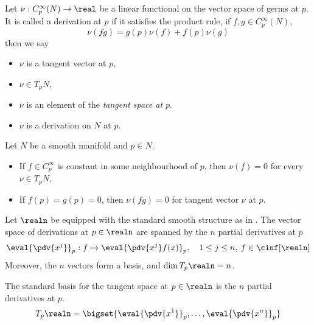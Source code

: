 \documentclass[../main-v2-manifolds.tex]{subfiles}
\begin{document}
\begin{definition}\label{lee-chp3:vector-space-of-derivations-at-p}
    Let $\nu: C_p^\infty(N)\to\real$ be a linear functional on the vector space of germs at $p$. It is called a derivation at $p$ if it satisfies the product rule, if $f,g\in C_p^\infty(N)$, 
    \[
        \nu(fg)=g(p)\nu(f)+f(p)\nu(g)
    \]
    then we say 
    \begin{itemize}
        \item $\nu$ is a tangent vector at $p$, 
        \item $\nu\in T_p N$,
        \item $\nu$ is an element of the \emph{tangent space at $p$}.
        \item $\nu$ is a derivation on $N$ at $p$.
    \end{itemize}
\end{definition}
\begin{wts}
    Let $N$ be a smooth manifold and $p\in N$.
    \begin{itemize}
        \item If $f\in C^\infty_p$ is constant in some neighbourhood of $p$, then $\nu(f)=0$ for every $\nu\in T_pN$,
        \item If $f(p)=g(p)=0$, then $\nu(fg)=0$ for tangent vector $\nu$ at $p$.
    \end{itemize}
\end{wts}


\begin{wts}
    Let $\realn$ be equipped with the standard smooth structure as in . The vector space of derivations at $p\in\realn$ are spanned by the $n$ partial derivatives at $p$
    \[
        \eval{\pdv{x^j}}_{p}:f\mapsto \eval{\pdv{x^j}f(x)}_{p},\quad 1\leq j\leq n,\: f\in \cinf[\realn]
    \]
    Moreover, the $n$ vectors form a basis, and $\dim T_p\realn= n$.
\end{wts}
\begin{definition}
    The standard basis for the tangent space at $p\in\realn$ is the $n$ partial derivatives at $p$.
    \begin{equation}\label{lee-chp3:standard-basis-for-tangent-space-realn}
        T_p\realn = \bigset{\eval{\pdv{x^1}}_{p},\ldots,\eval{\pdv{x^n}}_{p}}
    \end{equation}
\end{definition}
\end{document}
